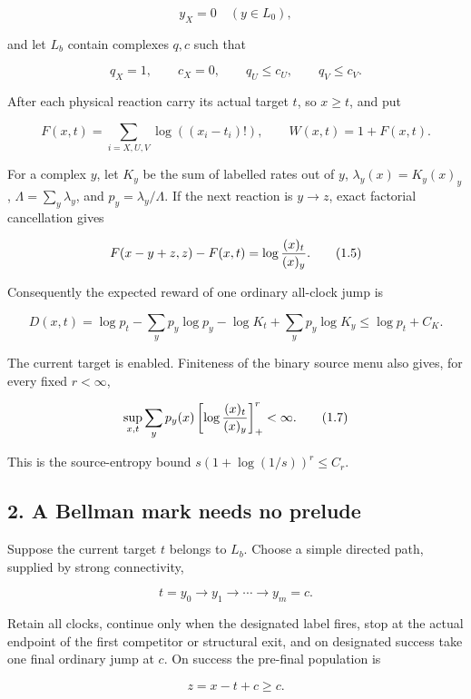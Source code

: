 \[
                         y_X=0\quad(y\in L_0),          \tag{1.2}
\]

and let \(L_b\) contain complexes \(q,c\) such that

\[
 q_X=1,\qquad c_X=0,\qquad q_U\le c_U,\qquad q_V\le c_V. \tag{1.3}
\]

After each physical reaction carry its actual target \(t\), so
\(x\ge t\), and put

\[
 F(x,t)=\sum_{i=X,U,V}\log((x_i-t_i)!),\qquad W(x,t)=1+F(x,t). \tag{1.4}
\]

For a complex \(y\), let \(K_y\) be the sum of labelled rates out of
\(y\), \(\lambda_y(x)=K_y(x)_y\), \(\Lambda=\sum_y\lambda_y\), and
\(p_y=\lambda_y/\Lambda\). If the next reaction is \(y\to z\), exact
factorial cancellation gives

\[
 F(x-y+z,z)-F(x,t)=\log{(x)_t\over(x)_y}.              \tag{1.5}
\]

Consequently the expected reward of one ordinary all-clock jump is

\[
 D(x,t)=\log p_t-\sum_y p_y\log p_y-\log K_t+
                         \sum_y p_y\log K_y
        \le \log p_t+C_K.                              \tag{1.6}
\]

The current target is enabled. Finiteness of the binary source menu also
gives, for every fixed \(r<\infty\),

\[
 \sup_{x,t}\sum_y p_y(x)
       \left[\log{(x)_t\over(x)_y}\right]_+^r<\infty.  \tag{1.7}
\]

This is the source-entropy bound \(s(1+\log(1/s))^r\le C_r\).

\subsection{2. A Bellman mark needs no
prelude}

Suppose the current target \(t\) belongs to \(L_b\). Choose a simple
directed path, supplied by strong connectivity,

\[
             t=y_0\longrightarrow y_1\longrightarrow\cdots
                        \longrightarrow y_m=c.         \tag{2.1}
\]

Retain all clocks, continue only when the designated label fires, stop
at the actual endpoint of the first competitor or structural exit, and
on designated success take one final ordinary jump at \(c\). On success
the pre-final population is

\[
                           z=x-t+c\ge c.                \tag{2.2}
\]


